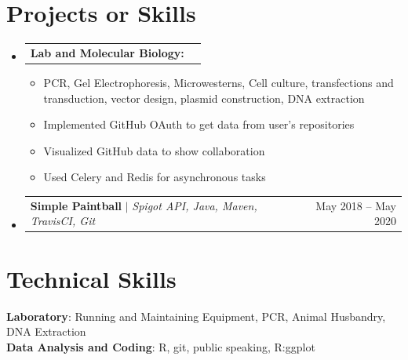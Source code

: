 \documentclass[letterpaper,11pt]{article}
\makeatletter
\newcommand{\resumeItem}[1]{
  \item\small{
    {#1 \vspace{-2pt}}
  }
}
\newcommand{\resumeSubheading}[4]{
  \vspace{-2pt}\item
    \begin{tabular*}{0.97\textwidth}[t]{l@{\extracolsep{\fill}}r}
      \textbf{#1} & #2 \\
      \textit{\small#3} & \textit{\small #4} \\
    \end{tabular*}\vspace{-7pt}
}
\newcommand{\resumeProjectHeading}[2]{
    \item
    \begin{tabular*}{0.97\textwidth}{l@{\extracolsep{\fill}}r}
      \small#1 & #2 \\
    \end{tabular*}\vspace{-7pt}
}
\newcommand{\resumeSubHeadingListStart}{\begin{itemize}[leftmargin=0.15in, label={}]}
\newcommand{\resumeSubHeadingListEnd}{\end{itemize}}
\newcommand{\resumeItemListStart}{\begin{itemize}}
\newcommand{\resumeItemListEnd}{\end{itemize}\vspace{-5pt}}
\makeatother
\begin{document}



\section{Projects or Skills}
    \resumeSubHeadingListStart
      \resumeProjectHeading
          {\textbf{Lab and Molecular Biology:}}{}
      \resumeItemListStart
        \resumeItem{PCR, Gel Electrophoresis, Microwesterns, Cell culture, transfections and transduction, vector design, plasmid construction, DNA extraction}
        \resumeItem{Implemented GitHub OAuth to get data from user's repositories}
        \resumeItem{Visualized GitHub data to show collaboration}
        \resumeItem{Used Celery and Redis for asynchronous tasks}
      \resumeItemListEnd
      \resumeProjectHeading
          {\textbf{Simple Paintball} $|$ \emph{Spigot API, Java, Maven, TravisCI, Git}}{May 2018 -- May 2020}
    \resumeSubHeadingListEnd



%
\section{Technical Skills}
 \begin{itemize}[leftmargin=0.15in, label={}]
    \small{\item{
     \textbf{Laboratory}{: Running and Maintaining Equipment, PCR, Animal Husbandry, DNA Extraction} \\
     \textbf{Data Analysis and Coding}{: R, git, public speaking, R:ggplot} \\
    }}
 \end{itemize}


\end{document}
